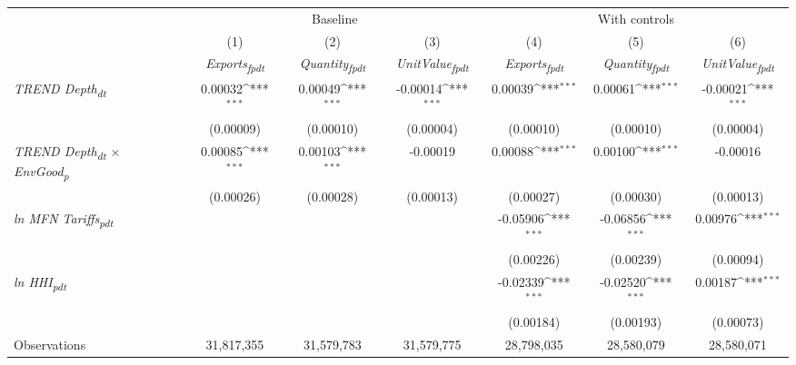 {
\def\sym#1{\ifmmode^{#1}\else\(^{#1}\)\fi}
\begin{tabular}{l*{6}{c}}
\toprule
                &\multicolumn{3}{c}{Baseline}                            &\multicolumn{3}{c}{With controls}                       \\\cmidrule(lr){2-4}\cmidrule(lr){5-7}
                &\multicolumn{1}{c}{(1)}&\multicolumn{1}{c}{(2)}&\multicolumn{1}{c}{(3)}&\multicolumn{1}{c}{(4)}&\multicolumn{1}{c}{(5)}&\multicolumn{1}{c}{(6)}\\
                &\multicolumn{1}{c}{\textit{Exports\textsubscript{fpdt}}}&\multicolumn{1}{c}{\textit{Quantity\textsubscript{fpdt}}}&\multicolumn{1}{c}{\textit{UnitValue\textsubscript{fpdt}}}&\multicolumn{1}{c}{\textit{Exports\textsubscript{fpdt}}}&\multicolumn{1}{c}{\textit{Quantity\textsubscript{fpdt}}}&\multicolumn{1}{c}{\textit{UnitValue\textsubscript{fpdt}}}\\
\midrule
\textit{TREND Depth\textsubscript{dt}}&  0.00032\sym{***}&  0.00049\sym{***}& -0.00014\sym{***}&  0.00039\sym{***}&  0.00061\sym{***}& -0.00021\sym{***}\\
                &(0.00009)         &(0.00010)         &(0.00004)         &(0.00010)         &(0.00010)         &(0.00004)         \\
\addlinespace
\textit{TREND Depth\textsubscript{dt} $\times$ EnvGood\textsubscript{p}}&  0.00085\sym{***}&  0.00103\sym{***}& -0.00019         &  0.00088\sym{***}&  0.00100\sym{***}& -0.00016         \\
                &(0.00026)         &(0.00028)         &(0.00013)         &(0.00027)         &(0.00030)         &(0.00013)         \\
\addlinespace
\textit{ln MFN Tariffs\textsubscript{pdt}}&                  &                  &                  & -0.05906\sym{***}& -0.06856\sym{***}&  0.00976\sym{***}\\
                &                  &                  &                  &(0.00226)         &(0.00239)         &(0.00094)         \\
\addlinespace
\textit{ln HHI\textsubscript{pdt}}&                  &                  &                  & -0.02339\sym{***}& -0.02520\sym{***}&  0.00187\sym{***}\\
                &                  &                  &                  &(0.00184)         &(0.00193)         &(0.00073)         \\
\midrule
Observations    &31,817,355         &31,579,783         &31,579,775         &28,798,035         &28,580,079         &28,580,071         \\

\end{tabular}}
